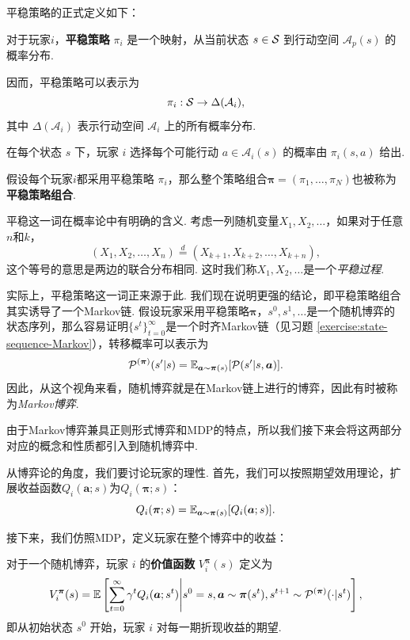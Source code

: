 平稳策略的正式定义如下：

\begin{definition}[平稳策略]
    对于玩家$i$，\textbf{平稳策略} $\pi_i$ 是一个映射，从当前状态 $s \in \mathcal S$ 到行动空间 $\mathcal{A}_p(s)$ 的概率分布. 
    
    因而，平稳策略可以表示为 
    \[\pi_i : \mathcal S \rightarrow \Delta(\mathcal{A}_i),\]
    其中 $\Delta(\mathcal{A}_i)$ 表示行动空间 $\mathcal{A}_i$ 上的所有概率分布. 
    
    在每个状态 $s$ 下，玩家 $i$ 选择每个可能行动 $a \in \mathcal{A}_i(s)$ 的概率由 $\pi_i(s,a)$ 给出. 
    
    假设每个玩家$i$都采用平稳策略 $\pi_i$，那么整个策略组合$\boldsymbol \pi=(\pi_1,\dots, \pi_N)$也被称为\textbf{平稳策略组合}.
\end{definition}

平稳这一词在概率论中有明确的含义. 考虑一列随机变量$X_1,X_2,\dots$，如果对于任意$n$和$k$，
\[(X_1,X_2,\dots,X_n)\stackrel{d}{=} (X_{k+1},X_{k+2},\dots,X_{k+n}),\]
这个等号的意思是两边的联合分布相同. 这时我们称$X_1,X_2,\dots$是一个\textit{平稳过程}.

实际上，平稳策略这一词正来源于此. 我们现在说明更强的结论，即平稳策略组合其实诱导了一个Markov链. 假设玩家采用平稳策略$\boldsymbol \pi$，$s^0,s^1,\dots$是一个随机博弈的状态序列，那么容易证明$\{s^t\}_{t=0}^{\infty}$是一个时齐Markov链（见习题 \ref{exercise:state-sequence-Markov}），转移概率可以表示为
\[\mathcal P^{(\boldsymbol \pi)}(s'|s)=\mathbb{E}_{\boldsymbol a\sim \boldsymbol \pi(s)}[\mathcal P(s'|s,\boldsymbol a)].\]
因此，从这个视角来看，随机博弈就是在Markov链上进行的博弈，因此有时被称为\textit{Markov博弈}.

由于Markov博弈兼具正则形式博弈和MDP的特点，所以我们接下来会将这两部分对应的概念和性质都引入到随机博弈中.

从博弈论的角度，我们要讨论玩家的理性. 首先，我们可以按照期望效用理论，扩展收益函数$Q_i(\boldsymbol a;s)$为$Q_i(\boldsymbol \pi;s)$：
\[Q_i(\boldsymbol \pi;s)=\mathbb{E}_{\boldsymbol a\sim \boldsymbol \pi(s)}[Q_i(\boldsymbol a;s)].\]

接下来，我们仿照MDP，定义玩家在整个博弈中的收益：

\begin{definition}[价值函数]
    对于一个随机博弈，玩家 $i$ 的\textbf{价值函数} $V_i^{\boldsymbol \pi}(s)$ 定义为
    \[V_i^{\boldsymbol \pi}(s) = \mathbb{E}\left[\sum_{t=0}^{\infty} \gamma^t Q_i(\boldsymbol a; s^t)\middle| s^0=s, \boldsymbol a\sim \boldsymbol \pi(s^t), s^{t+1}\sim \mathcal P^{(\boldsymbol \pi)}(\cdot|s^t)\right],\]
    即从初始状态 $s^0$ 开始，玩家 $i$ 对每一期折现收益的期望.
\end{definition}

